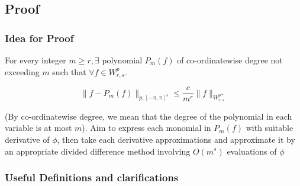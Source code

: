 \documentclass[11pt,a4paper]{article}
\theoremstyle{plain}
\theoremstyle{definition}
\theoremstyle{remark}
\begin{document}
\subsection{Proof} 

\subsubsection{Idea for Proof}

For every integer \(m \geq r, \exists \) polynomial \(P_{m}(f)\) of co-ordinatewise degree not exceeding \(m\) such that \(\forall f \in W^{p}_{r,s}\).

\[
\|f - P_{m}(f)\|_{p,[-\pi,\pi]^s} \leq \frac{c}{m^r} \|f\|_{W^{p*}_{r,s}}  
\]

(By co-ordinatewise degree, we mean that the degree of the polynomial in each variable is at most \(m\)). Aim to express each monomial in \(P_{m}(f)\) with suitable derivative of \(\phi \), then take each derivative approximations and approximate it by an appropriate divided difference method involving \(O(m^s)\) evaluations of \(\phi \) 

\subsubsection{Useful Definitions and clarifications}
\end{document}
